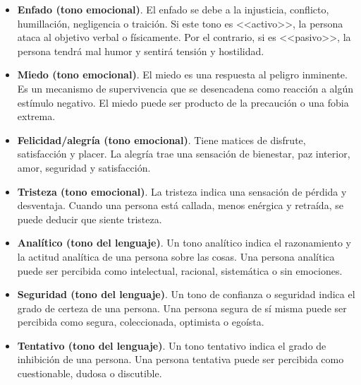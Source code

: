 \begin{itemize}
	\item \textbf{Enfado (tono emocional)}. El enfado se debe a la injusticia, conflicto, humillación, negligencia o traición. Si este tono es <<activo>>, la persona ataca al objetivo verbal o físicamente. Por el contrario, si es <<pasivo>>, la persona tendrá mal humor y sentirá tensión y hostilidad.
	\item \textbf{Miedo (tono emocional)}. El miedo es una respuesta al peligro inminente. Es un mecanismo de supervivencia que se desencadena como reacción a algún estímulo negativo. El miedo puede ser producto de la precaución o una fobia extrema.
	\item \textbf{Felicidad/alegría (tono emocional)}. Tiene matices de disfrute, satisfacción y placer. La alegría trae una sensación de bienestar, paz interior, amor, seguridad y satisfacción.
	\item \textbf{Tristeza (tono emocional)}. La tristeza indica una sensación de pérdida y desventaja. Cuando una persona está callada, menos enérgica y retraída, se puede deducir que siente tristeza.
	\item \textbf{Analítico (tono del lenguaje)}. Un tono analítico indica el razonamiento y la actitud analítica de una persona sobre las cosas. Una persona analítica puede ser percibida como intelectual, racional, sistemática o sin emociones.
	\item \textbf{Seguridad (tono del lenguaje)}. Un tono de confianza o seguridad indica el grado de certeza de una persona. Una persona segura de sí misma puede ser percibida como segura, coleccionada, optimista o egoísta.
	\item \textbf{Tentativo (tono del lenguaje)}. Un tono tentativo indica el grado de inhibición de una persona. Una persona tentativa puede ser percibida como cuestionable, dudosa o discutible.
\end{itemize}

\clearpage

